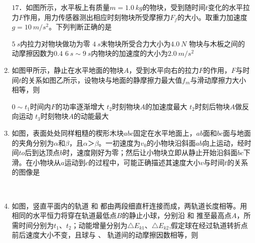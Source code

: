 \begin{enumerate}[leftmargin=0em]
$ 17 $．如图所示，水平板上有质量$ m=1.0 \ kg $的物块，受到随时间$ t $变化的水平拉力$ F $作用，用力传感器测出相应时刻物块所受摩擦力$ F_{f} $的大小。取重力加速度$ g=10 \ m/s^{2} $。下列判断正确的是  
\begin{figure}[h!]
\centering
 \qquad 
  
\end{figure}

\fourchoices
{$ 5\ s $内拉力对物块做功为零}
{$ 4\ s $末物块所受合力大小为$ 4.0 \ N $}
{物块与木板之间的动摩擦因数为$ 0.4 $}
{$ 6\ s \sim 9\ s $内物块的加速度的大小为$ 2.0 \ m/s^{2} $}



\item
{}
如图甲所示，静止在水平地面的物块$ A $，受到水平向右的拉力$ F $的作用，$ F $与时间$ t $的关系如图乙所示，设物块与地面的静摩擦力最大值$ f_m $与滑动摩擦力大小相等，则  
\begin{figure}[h!]
\centering

\end{figure}

\fourchoices
{$ 0 \sim t_{1} $时间内$ F $的功率逐渐增大}
{$ t_{2} $时刻物块$ A $的加速度最大}
{$ t_{2} $时刻后物块$ A $做反向运动}
{$ t_{3} $时刻物块$ A $的动能最大}



\item
{}
如图，表面处处同样粗糙的楔形木块$ abc $固定在水平地面上，$ ab $面和$ bc $面与地面的夹角分别为$ \alpha $和$ \beta $，且$ \alpha $＞$ \beta $。一初速度为$ v_{0} $的小物块沿斜面$ ab $向上运动，经时间$ to $后到达顶点$ b $时，速度刚好为零；然后让小物块立即从静止开始沿斜面$ bc $下滑。在小物块从$ a $运动到$ c $的过程中，可能正确描述其速度大小$ v $与时间$ t $的关系的图像是  
\begin{figure}[h!]
\centering
\\
  
\end{figure}



\item 
{}
如图，竖直平面内的轨道  和  都由两段细直杆连接而成，两轨道长度相等。用相同的水平恒力将穿在轨道最低点$ B $的静止小球，分别沿  和  推至最高点$ A $，所需时间分别为$ t_{1} $、$ t_{2} $；动能增量分别为$ \triangle E_{k1} $、$ \triangle E_{k2} $,假定球在经过轨道转折点前后速度大小不变，且球与  、  轨道间的动摩擦因数相等，则  
\begin{figure}[h!]
\centering

\end{figure}


\end{enumerate}
